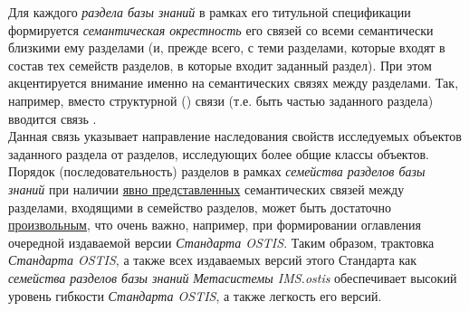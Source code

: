 \begin{SCn}
{	Для каждого \textit{раздела базы знаний} в рамках его титульной спецификации формируется \textit{семантическая окрестность} его связей со всеми семантически близкими ему разделами (и, прежде всего, с теми разделами, которые входят в состав тех семейств разделов, в которые входит заданный раздел). При этом акцентируется внимание именно на семантических связях между разделами. Так, например, вместо структурной () связи  (т.е. быть частью заданного раздела) вводится связь . \\
	Данная связь указывает направление наследования свойств исследуемых объектов заданного раздела от разделов, исследующих более общие классы объектов.
	Порядок (последовательность) разделов в рамках \textit{семейства разделов базы знаний} при наличии \uline{явно представленных} семантических связей между разделами, входящими в семейство разделов, может быть достаточно \uline{произвольным}, что очень важно, например, при формировании оглавления очередной издаваемой версии \textit{Стандарта OSTIS}. Таким образом, трактовка \textit{Стандарта OSTIS}, а также всех издаваемых версий этого Стандарта как \textit{семейства разделов базы знаний} \scnbigskip \textit{Метасистемы IMS.ostis} обеспечивает высокий уровень гибкости \textit{Стандарта OSTIS}, а также легкость  его версий.}



\end{SCn}
